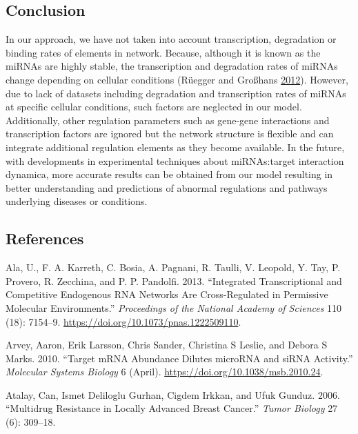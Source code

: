 \documentclass[]{article}
\begin{document}
\hypertarget{conclusion}{%
\subsection{Conclusion}\label{conclusion}}

In our approach, we have not taken into account transcription,
degradation or binding rates of elements in network. Because, although
it is known as the miRNAs are highly stable, the transcription and
degradation rates of miRNAs change depending on cellular conditions
(Rüegger and Großhans
\protect\hyperlink{ref-ruegger_microrna_2012}{2012}). However, due to
lack of datasets including degradation and transcription rates of miRNAs
at specific cellular conditions, such factors are neglected in our
model. Additionally, other regulation parameters such as gene-gene
interactions and transcription factors are ignored but the network
structure is flexible and can integrate additional regulation elements
as they become available. In the future, with developments in
experimental techniques about miRNAs:target interaction dynamica, more
accurate results can be obtained from our model resulting in better
understanding and predictions of abnormal regulations and pathways
underlying diseases or conditions.

\hypertarget{references}{%
\subsection*{References}\label{references}}

\hypertarget{refs}{}
\leavevmode\hypertarget{ref-ala_integrated_2013}{}%
Ala, U., F. A. Karreth, C. Bosia, A. Pagnani, R. Taulli, V. Leopold, Y.
Tay, P. Provero, R. Zecchina, and P. P. Pandolfi. 2013. ``Integrated
Transcriptional and Competitive Endogenous RNA Networks Are
Cross-Regulated in Permissive Molecular Environments.''
\emph{Proceedings of the National Academy of Sciences} 110 (18):
7154--9. \url{https://doi.org/10.1073/pnas.1222509110}.

\leavevmode\hypertarget{ref-arvey_target_2010}{}%
Arvey, Aaron, Erik Larsson, Chris Sander, Christina S Leslie, and Debora
S Marks. 2010. ``Target mRNA Abundance Dilutes microRNA and siRNA
Activity.'' \emph{Molecular Systems Biology} 6 (April).
\url{https://doi.org/10.1038/msb.2010.24}.

\leavevmode\hypertarget{ref-atalay2006multidrug}{}%
Atalay, Can, Ismet Deliloglu Gurhan, Cigdem Irkkan, and Ufuk Gunduz.
2006. ``Multidrug Resistance in Locally Advanced Breast Cancer.''
\emph{Tumor Biology} 27 (6): 309--18.
\end{document}
